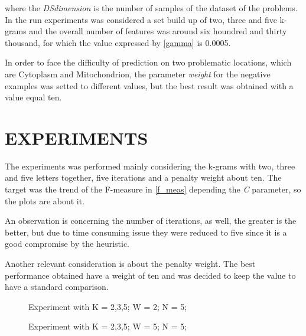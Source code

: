 \documentclass{acm_proc_article-sp-sigmod07}
\begin{document}
where the \emph{DSdimension} is the number of samples of the dataset of the
problems. In the run experiments was considered a set build up of two, three and
five k-grams and the overall number of features was around six houndred and 
thirty thousand, for which the value expressed by \ref{gamma} is 0.0005.

In order to face the difficulty of prediction on two problematic locations,
which are Cytoplasm and Mitochondrion, the parameter \emph{weight} for the
negative examples was setted to different values, but the best result was 
obtained with a value equal ten.

\section{EXPERIMENTS}
The experiments was performed mainly considering the k-grams with two, three and
five letters together, five iterations and a penalty weight about ten.
The target was the trend of the F-measure in \ref{f_meas} depending the \emph{C}
parameter, so the plots are about it.

An observation is concerning the number of iterations, as well, the greater is 
the better, but due to time consuming issue they were reduced to five since it
is a good compromise by the heuristic. 

Another relevant consideration is about the penalty weight. The best performance
obtained have a weight of ten and was decided to keep the value to have a standard
comparison.


\begin{figure*}
\label{fig:K235W2N5}
\centering
{}
\caption{Experiment with K = 2,3,5; W = 2; N = 5;}
\end{figure*}

\begin{figure*}
\label{fig:K235W5N5}
\centering
{}
\caption{Experiment with K = 2,3,5; W = 5; N = 5;}
\end{figure*}
\end{document}

